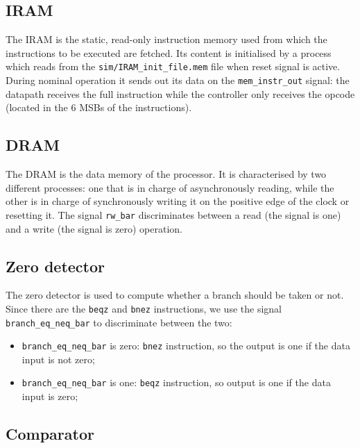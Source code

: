  \subsection{IRAM}
 
The IRAM is the static, read-only instruction memory used from which the instructions to be executed are fetched. 
Its content is initialised by a process which reads from the \texttt{sim/IRAM\_init\_file.mem} file when reset signal is active.
During nominal operation it sends out its data on the \texttt{mem\_instr\_out} signal: the datapath receives the full instruction while the controller only receives the opcode (located in the 6 MSBs of the instructions). 


 \subsection{DRAM}

The DRAM is the data memory of the processor.
It is characterised by two different processes: one that is in charge of asynchronously reading, while the other is in charge of synchronously writing it on the positive edge of the clock or resetting it.
The signal \texttt{rw\_bar} discriminates between a read (the signal is one) and a write (the signal is zero) operation.

 
 \subsection{Zero detector}

The zero detector is used to compute whether a branch should be taken or not. 
Since there are the \texttt{beqz} and \texttt{bnez} instructions, we use the signal \texttt{branch\_eq\_neq\_bar} to discriminate between the two:
\begin{itemize}
    \item \texttt{branch\_eq\_neq\_bar} is zero: \texttt{bnez} instruction, so the output is one if the data input is not zero;
    \item \texttt{branch\_eq\_neq\_bar} is one: \texttt{beqz} instruction, so output is one if the data input is zero;

\end{itemize}

 
 \subsection{Comparator}

